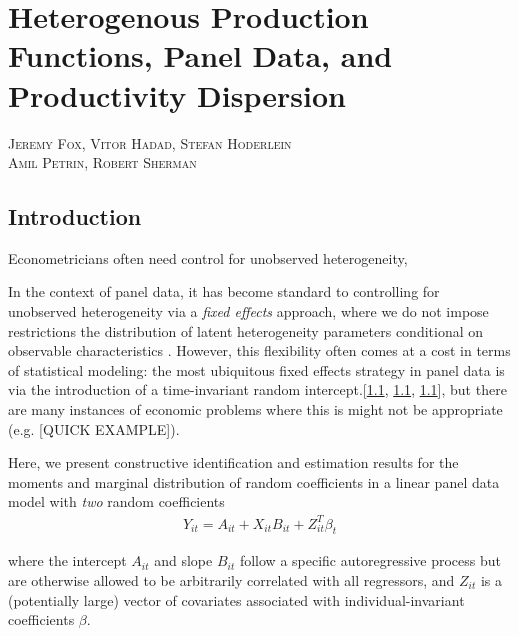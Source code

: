 \chapter{Heterogenous Production Functions, Panel Data, and Productivity Dispersion}
\begin{center}
\large
\textsc{Jeremy Fox, Vitor Hadad, Stefan Hoderlein} \\ \textsc{Amil Petrin, Robert Sherman}
\end{center}

\doublespacing

\section{Introduction}

Econometricians often need control for unobserved heterogeneity, 


In the context of panel data, it has become standard to controlling for unobserved heterogeneity via a \emph{fixed effects} approach, where we do not impose restrictions the distribution of latent heterogeneity parameters conditional on observable characteristics \citet{wooldridge2010econometric}. However, this flexibility often comes at a cost in terms of statistical modeling: the most ubiquitous fixed effects strategy in panel data is via the introduction of a time-invariant random intercept.[\ref{}, \ref{}, \ref{}], but there are many instances of economic problems where this is might not be appropriate (e.g. [QUICK EXAMPLE]).

Here, we present constructive identification and estimation results for the moments and marginal distribution of random coefficients in a linear panel data model with \emph{two} random coefficients
\begin{align}
  Y_{it} = A_{it} + X_{it}B_{it} + Z_{it}^{T}\beta_{t}
\end{align}

\noindent where the intercept $A_{it}$ and slope $B_{it}$ follow a specific autoregressive process but are otherwise allowed to be arbitrarily correlated with all regressors, and $Z_{it}$ is a (potentially large) vector of covariates associated with individual-invariant coefficients $\beta$.


